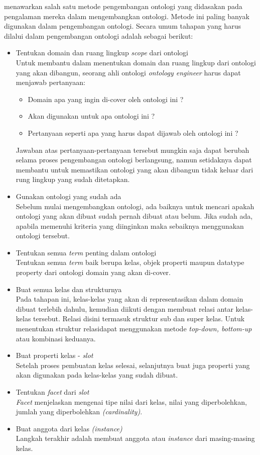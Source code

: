 \citet{noy_mcguinness} menawarkan salah satu metode pengembangan ontologi yang didasakan pada pengalaman mereka dalam mengembangkan ontologi. Metode ini paling banyak digunakan dalam pengembangan ontologi. Secara umum tahapan yang harus dilalui dalam pengembangan ontologi adalah sebagai berikut:
\begin{itemize}
	\item Tentukan domain dan ruang lingkup \emph{scope} dari ontologi\\
	Untuk membantu dalam menentukan domain dan ruang lingkup dari ontologi yang akan dibangun, seorang ahli ontologi \emph{ontology engineer} harus dapat menjawab pertanyaan:
	\begin{itemize}
		\item Domain apa yang ingin di-cover oleh ontologi ini ?
		\item Akan digunakan untuk apa ontologi ini ?
		\item Pertanyaan seperti apa yang harus dapat dijawab oleh ontologi ini ?
	\end{itemize}
	Jawaban atas pertanyaan-pertanyaan tersebut mungkin saja dapat berubah selama proses pengembangan ontologi berlangsung, namun setidaknya dapat membantu untuk memastikan ontologi yang akan dibangun tidak keluar dari rung lingkup yang sudah ditetapkan.
	\item Gunakan ontologi yang sudah ada\\
	Sebelum mulai mengembangkan ontologi, ada baiknya untuk mencari apakah ontologi yang akan dibuat sudah pernah dibuat atau belum. Jika sudah ada, apabila memenuhi kriteria yang diinginkan maka sebaiknya menggunakan ontologi tersebut.
	\item Tentukan semua \emph{term} penting dalam ontologi\\
	Tentukan semua \emph{term} baik berupa kelas, objek properti maupun datatype property dari ontologi domain yang akan di-cover.
	\item Buat semua kelas dan strukturnya\\
	Pada tahapan ini, kelas-kelas yang akan di representasikan dalam domain dibuat terlebih dahulu, kemudian diikuti dengan membuat relasi antar kelas-kelas tersebut. Relasi disini termasuk struktur sub dan super kelas. Untuk menentukan struktur relasidapat menggunakan metode \emph{top-down, bottom-up} atau kombinasi keduanya.
	\item Buat properti kelas - \emph{slot}\\
	Setelah proses pembuatan kelas selesai, selanjutnya buat juga properti yang akan digunakan pada kelas-kelas yang sudah dibuat.
	\item Tentukan \emph{facet} dari \emph{slot}\\
	\emph{Facet} menjelaskan mengenai tipe nilai dari kelas, nilai yang diperbolehkan, jumlah yang diperbolehkan \emph{(cardinality)}.
	\item Buat anggota dari kelas \emph{(instance)}\\
	Langkah terakhir adalah membuat anggota atau \emph{instance} dari masing-masing kelas.
\end{itemize}